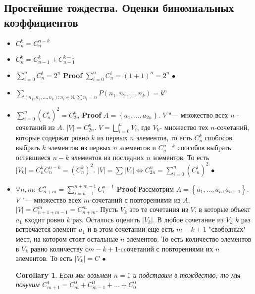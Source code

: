 \documentclass[a4paper]{article}
\theoremstyle{plain}
\newtheorem{corollary}{Corollary}
\theoremstyle{remark}
\theoremstyle{definition}
\renewenvironment{proof}{{\bfseries Proof}}{$\bullet$}
\newcommand{\combru}[2]{C_{#1}^{#2}} %
\newcommand{\myN}{\mathbb{N}}
\newcommand{\mysum}{\sum\limits}
\newcommand{\myset}[1]{\left\{ #1 \right\}}
\begin{document}
\subsection{Простейшие тождества. Оценки биномиальных коэффициентов}
\begin{itemize}
	\item $\combru{n}{k} = \combru{n}{n-k}$
	\item $\combru{n}{k} = \combru{n-1}{k} + \combru{n-1}{k-1}$
	\item $\mysum_{i=0}^{n} \combru{n}{i} = 2^n$
		\begin{proof}
			$\mysum_{i=0}^n \combru{n}{i} = (1 + 1) ^ n = 2 ^ n$
		\end{proof}
	\item $\mysum_{(n_1, n_2, \ldots, n_k): n_i \in \myN, \mysum n_i = n}P(n_1,n_2, \ldots, n_k) = k^n$
	\item $\mysum_{i=0}^{n}(\combru{n}{i})^2 = \combru{2n}{n}$	
		\begin{proof}
			$A = \myset{a_1, \ldots, a_{2n}}$. $V$ "--- множество всех $n$ - сочетаний из $A$. $|V| = \combru{2n}{n}$. $V = \bigsqcup\limits_{i=0}^n V_i$, где $V_k$- множество тех $n$-сочетаний, которые содержат ровно $k$ из первых $n$ элементов, то есть $\combru{n}{k}$ спобосов выбрать $k$ элементов из первых $n$ элементов и $\combru{n}{n-k}$ способов выбрать оставшиеся $n-k$ элементов из последних $n$ элементов. То есть $|V_k| = \combru{n}{k}\combru{n}{n-k} = (\combru{n}{k})^2$. 
			$|V| = \sum |V_i| \Leftrightarrow \combru{2n}{n} = \mysum_{i=0}^{n}(\combru{n}{i})^2$
		\end{proof}
	\item $\forall n,m:\ \combru{n+m}{n} = \mysum_{i=n-1}^{n+m-1} \combru{i}{n-1}$
		\begin{proof}
			Рассмотрим $A = \myset{a_1, \ldots, a_n, a_{n+1}}$. $V$ "--- множество всех $m$-сочетаний с повторениями из $A$. $|V| = \combru{n+1+m-1}{m} = \combru{n+m}{m}$. Пусть $V_k$ это те сочетания из $V$, в которые объект $a_1$ входит ровно $k$ раз. Осталось оценить $|V_k|$. В любое сочетание из $V_k$ $k$ раз встречается элемент $a_1$ и в этом сочетании еще есть $m-k+1$ "свободных" мест, на котором стоят остальные $n$ элементов. То есть количество элементов в $V_k$ равно количеству с$m-k+1$-ccочетаний с повторениями их $n$ элементов. То есть $|V_k| = \combru{}{}$ %
		\end{proof} 
		\begin{corollary}
			Если мы возьмем $n = 1$ и подставим в тождество, то мы получим $\combru{m+1}{1} = \combru{m}{0} + \combru{m-1}{0} + \ldots + \combru{0}{0}$

\end{corollary}
\end{itemize}
\end{document}
